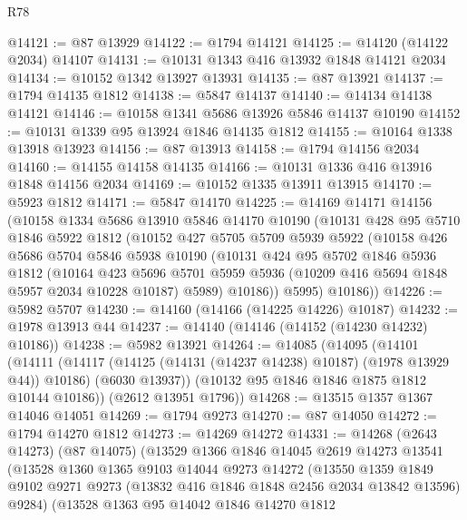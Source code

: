\begin{lexlean}{R78}
\begin{coremodule}
@14121 := @87 @13929
@14122 := @1794 @14121
@14125 := @14120 (@14122 @2034) @14107
@14131 := @10131 @1343 @416 @13932 @1848 @14121 @2034
@14134 := @10152 @1342 @13927 @13931
@14135 := @87 @13921
@14137 := @1794 @14135 @1812
@14138 := @5847 @14137
@14140 := @14134 @14138 @14121
@14146 := @10158 @1341 @5686 @13926 @5846 @14137 @10190
@14152 := @10131 @1339 @95 @13924 @1846 @14135 @1812
@14155 := @10164 @1338 @13918 @13923
@14156 := @87 @13913
@14158 := @1794 @14156 @2034
@14160 := @14155 @14158 @14135
@14166 := @10131 @1336 @416 @13916 @1848 @14156 @2034
@14169 := @10152 @1335 @13911 @13915
@14170 := @5923 @1812
@14171 := @5847 @14170
@14225 := @14169
    @14171
    @14156
    (@10158
      @1334
      @5686
      @13910
      @5846
      @14170
      @10190
      (@10131
        @428
        @95
        @5710
        @1846
        @5922
        @1812
        (@10152
          @427
          @5705
          @5709
          @5939
          @5922
          (@10158
            @426
            @5686
            @5704
            @5846
            @5938
            @10190
            (@10131
              @424
              @95
              @5702
              @1846
              @5936
              @1812
              (@10164
                @423
                @5696
                @5701
                @5959
                @5936
                (@10209 @416 @5694 @1848 @5957 @2034 @10228 @10187)
                @5989)
              @10186))
          @5995)
        @10186))
@14226 := @5982 @5707
@14230 := @14160 (@14166 (@14225 @14226) @10187)
@14232 := @1978 @13913 @44
@14237 := @14140 (@14146 (@14152 (@14230 @14232) @10186))
@14238 := @5982 @13921
@14264 := @14085
    (@14095
      (@14101
        (@14111
          (@14117 (@14125 (@14131 (@14237 @14238) @10187) (@1978 @13929 @44)) @10186)
          (@6030 @13937))
        (@10132 @95 @1846 @1846 @1875 @1812 @10144 @10186))
      (@2612 @13951 @1796))
@14268 := @13515 @1357 @1367 @14046 @14051
@14269 := @1794 @9273
@14270 := @87 @14050
@14272 := @1794 @14270 @1812
@14273 := @14269 @14272
@14331 := @14268
    (@2643 @14273)
    (@87 @14075)
    (@13529
      @1366
      @1846
      @14045
      @2619
      @14273
      @13541
      (@13528
        @1360
        @1365
        @9103
        @14044
        @9273
        @14272
        (@13550
          @1359
          @1849
          @9102
          @9271
          @9273
          (@13832 @416 @1846 @1848 @2456 @2034 @13842 @13596)
          @9284)
        (@13528
          @1363
          @95
          @14042
          @1846
          @14270
          @1812

\end{coremodule}
\end{lexlean}
